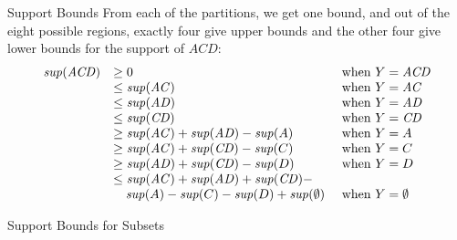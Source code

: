 \begin{frame}{Support Bounds}
From each of the partitions, we
get one bound, and out of the eight possible regions, exactly four give
upper bounds and the other four give lower bounds for the support of $\mathit{ACD}$:
\begin{align*}
\begin{array}{lll}
    \mathit{sup}(\mathit{ACD}) & \geq 0                   & \mbox{ when } Y=\mathit{ACD}\\
    &\leq \mathit{sup}(\mathit{AC})                     & \mbox{ when } Y=\mathit{AC}\\
    &\leq \mathit{sup}(\mathit{AD})                  & \mbox{ when } Y=\mathit{AD}\\
    &\leq \mathit{sup}(\mathit{CD})                     & \mbox{ when } Y=\mathit{CD}\\
    &\geq \mathit{sup}(\mathit{AC}) +\mathit{sup}(\mathit{AD}) - \mathit{sup}(A)   & \mbox{ when } Y=A\\
    &\geq \mathit{sup}(\mathit{AC}) + \mathit{sup}(\mathit{CD}) - \mathit{sup}(C)  & \mbox{ when } Y=C\\
    &\geq \mathit{sup}(\mathit{AD}) +\mathit{sup}(\mathit{CD}) - \mathit{sup}(D)   & \mbox{ when } Y=D\\
    &\leq \mathit{sup}(\mathit{AC}) + \mathit{sup}(\mathit{AD}) + \mathit{sup}(\mathit{CD})- \\
    & \quad \mathit{sup}(A) - \mathit{sup}(C) - \mathit{sup}(D)
    + \mathit{sup}(\emptyset) &\mbox{ when } Y=\emptyset\\
\end{array}
\end{align*}

\end{frame}



\begin{frame}{Support Bounds for Subsets}
  \begin{center}
  \end{center}
\end{frame}


